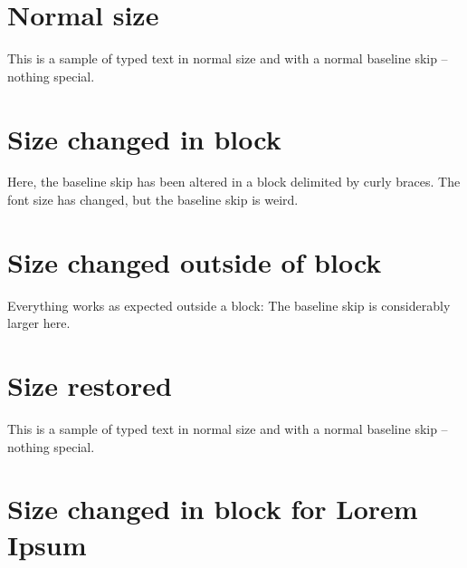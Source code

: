 \documentclass{scrartcl}
\begin{document}
\section{Normal size}

This is a sample of typed text in normal size and with a normal baseline skip -- nothing special.

\section{Size changed in block}

  {\fontsize{15}{20}\selectfont
Here, the baseline skip has been altered in a block delimited by curly braces. The font size has changed, but the baseline skip is weird.
  }

\section{Size changed outside of block}

  \fontsize{15}{20}\selectfont
Everything works as expected outside a block: The baseline skip is considerably larger here.

\section{Size restored}

\normalsize
This is a sample of typed text in normal size and with a normal baseline skip -- nothing special.

\section{Size changed in block for Lorem Ipsum}

  {\fontsize{15}{20}\selectfont\lipsum[1]}
  
\end{document}
